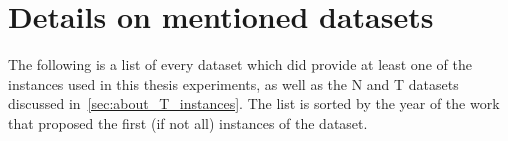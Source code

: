 \documentclass[ppgc,tese,english,formais,babel]{iiufrgs}
\newif\iffinalversion
\newcommand{\oldtext}[1]{\iffinalversion%
\else%
\textcolor{red}{#1}%
\fi%
}
\begin{document}


%




\appendix

\chapter{Details on mentioned datasets}
\label{sec:datasets}

The following is a list of every dataset which did provide at least one of the instances used in this thesis experiments, as well as the N and T datasets discussed in~\cref{sec:about_T_instances}.
The list is sorted by the year of the work that proposed the first (if not all) instances of the dataset.

\end{document}
